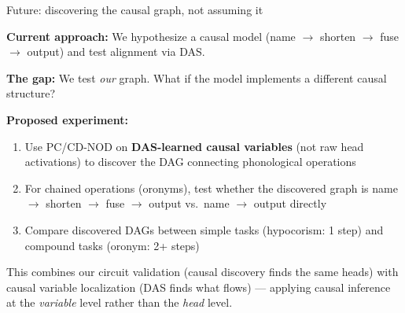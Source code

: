 \documentclass[10pt,aspectratio=169]{beamer}
\begin{document}
\begin{frame}{Future: discovering the causal graph, not assuming it}

\textbf{Current approach:} We hypothesize a causal model (name $\to$ shorten $\to$ fuse $\to$ output) and test alignment via DAS.

\vspace{0.3em}
\textbf{The gap:} We test \emph{our} graph. What if the model implements a different causal structure?

\vspace{0.5em}
\textbf{Proposed experiment:}
\begin{enumerate}
  \item Use PC/CD-NOD on \textbf{DAS-learned causal variables} (not raw head activations) to discover the DAG connecting phonological operations
  \item For chained operations (oronyms), test whether the discovered graph is name $\to$ shorten $\to$ fuse $\to$ output vs.\ name $\to$ output directly
  \item Compare discovered DAGs between simple tasks (hypocorism: 1 step) and compound tasks (oronym: 2+ steps)
\end{enumerate}

\vspace{0.3em}
{\small This combines our circuit validation (causal discovery finds the same heads) with causal variable localization (DAS finds what flows) --- applying causal inference at the \emph{variable} level rather than the \emph{head} level.}
\end{frame}
\end{document}

